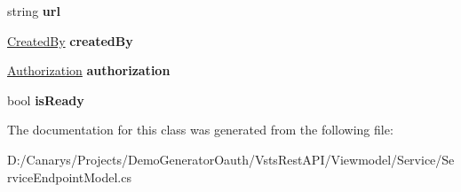 \begin{DoxyCompactItemize}
string {\bfseries url}
\item 
\mbox{\label{class_vsts_rest_a_p_i_1_1_viewmodel_1_1_service_1_1_service_endpoint_model_a481b493702ac12dee9ac451f6ba35051}} 
\mbox{\hyperlink{class_vsts_rest_a_p_i_1_1_viewmodel_1_1_service_1_1_created_by}{Created\+By}} {\bfseries created\+By}
\item 
\mbox{\label{class_vsts_rest_a_p_i_1_1_viewmodel_1_1_service_1_1_service_endpoint_model_a9d3ee5ddc1bbc6c917adfa55c4ef4973}} 
\mbox{\hyperlink{class_vsts_rest_a_p_i_1_1_viewmodel_1_1_service_1_1_authorization}{Authorization}} {\bfseries authorization}
\item 
\mbox{\label{class_vsts_rest_a_p_i_1_1_viewmodel_1_1_service_1_1_service_endpoint_model_acdce8d0c7a68e2ca078e40639e058ca1}} 
bool {\bfseries is\+Ready}
\end{DoxyCompactItemize}


The documentation for this class was generated from the following file\+:\begin{DoxyCompactItemize}
\item 
D\+:/\+Canarys/\+Projects/\+Demo\+Generator\+Oauth/\+Vsts\+Rest\+A\+P\+I/\+Viewmodel/\+Service/Service\+Endpoint\+Model.\+cs\end{DoxyCompactItemize}
